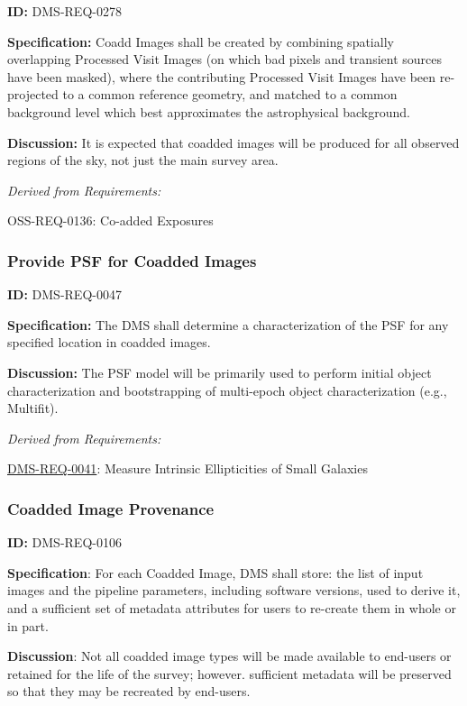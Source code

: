\documentclass[SE,toc,lsstdraft]{lsstdoc}
\begin{document}
\label{DMS-REQ-0278}
\textbf{ID:} DMS-REQ-0278

\textbf{Specification:} Coadd Images shall be created by combining spatially overlapping Processed Visit Images (on which bad pixels and transient sources have been masked), where the contributing Processed Visit Images have been re-projected to a common reference geometry, and matched to a common background level which best approximates the astrophysical background.

\textbf{Discussion:} It is expected that coadded images will be produced for all observed regions of the sky, not just the main survey area.




\emph{Derived from Requirements:}

OSS-REQ-0136:
Co-added Exposures \newline


\subsubsection{Provide PSF for Coadded Images}

\label{DMS-REQ-0047}
\textbf{ID:} DMS-REQ-0047

\textbf{Specification:} The DMS shall determine a characterization of the PSF for any specified location in coadded images.

\textbf{Discussion:} The PSF model will be primarily used to perform initial object characterization and bootstrapping of multi-epoch object characterization (e.g., Multifit).




\emph{Derived from Requirements:}

\hyperref[DMS-REQ-0041]{DMS-REQ-0041}:
Measure Intrinsic Ellipticities of Small Galaxies \newline


\subsubsection{Coadded Image Provenance}

\label{DMS-REQ-0106}
\textbf{ID:} DMS-REQ-0106

\textbf{Specification}: For each Coadded Image, DMS shall store: the list of input images and the pipeline parameters, including software versions, used to derive it, and a sufficient set of metadata attributes for users to re-create them in whole or in part.

\textbf{Discussion}: Not all coadded image types will be made available to end-users or retained for the life of the survey; however. sufficient metadata will be preserved so that they may be recreated by end-users.
\end{document}
